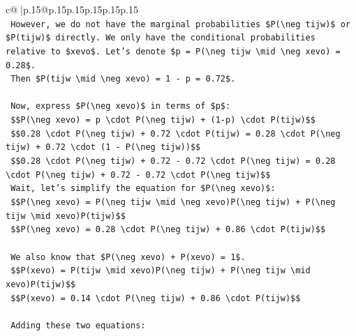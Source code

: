 \documentclass{article}
\begin{document}
{\begin{supertabular}{c@{$\;$}|p{.15\linewidth}@{}p{.15\linewidth}p{.15\linewidth}p{.15\linewidth}p{.15\linewidth}p{.15\linewidth}}
{{{\\ 
\texttt{    However, we do not have the marginal probabilities \$P(\textbackslash{}neg tijw)\$ or \$P(tijw)\$ directly. We only have the conditional probabilities relative to \$xevo\$. Let's denote \$p = P(\textbackslash{}neg tijw \textbackslash{}mid \textbackslash{}neg xevo) = 0.28\$.} \\
\texttt{    Then \$P(tijw \textbackslash{}mid \textbackslash{}neg xevo) = 1 {-} p = 0.72\$.} \\
\\ 
\texttt{    Now, express \$P(\textbackslash{}neg xevo)\$ in terms of \$p\$:} \\
\texttt{    \$\$P(\textbackslash{}neg xevo) = p \textbackslash{}cdot P(\textbackslash{}neg tijw) + (1{-}p) \textbackslash{}cdot P(tijw)\$\$} \\
\texttt{    \$\$0.28 \textbackslash{}cdot P(\textbackslash{}neg tijw) + 0.72 \textbackslash{}cdot P(tijw) = 0.28 \textbackslash{}cdot P(\textbackslash{}neg tijw) + 0.72 \textbackslash{}cdot (1 {-} P(\textbackslash{}neg tijw))\$\$} \\
\texttt{    \$\$0.28 \textbackslash{}cdot P(\textbackslash{}neg tijw) + 0.72 {-} 0.72 \textbackslash{}cdot P(\textbackslash{}neg tijw) = 0.28 \textbackslash{}cdot P(\textbackslash{}neg tijw) + 0.72 {-} 0.72 \textbackslash{}cdot P(\textbackslash{}neg tijw)\$\$} \\
\texttt{    Wait, let's simplify the equation for \$P(\textbackslash{}neg xevo)\$:} \\
\texttt{    \$\$P(\textbackslash{}neg xevo) = P(\textbackslash{}neg tijw \textbackslash{}mid \textbackslash{}neg xevo)P(\textbackslash{}neg tijw) + P(\textbackslash{}neg tijw \textbackslash{}mid xevo)P(tijw)\$\$} \\
\texttt{    \$\$P(\textbackslash{}neg xevo) = 0.28 \textbackslash{}cdot P(\textbackslash{}neg tijw) + 0.86 \textbackslash{}cdot P(tijw)\$\$} \\
\\ 
\texttt{    We also know that \$P(\textbackslash{}neg xevo) + P(xevo) = 1\$.} \\
\texttt{    \$\$P(xevo) = P(tijw \textbackslash{}mid xevo)P(\textbackslash{}neg tijw) + P(\textbackslash{}neg tijw \textbackslash{}mid xevo)P(tijw)\$\$} \\
\texttt{    \$\$P(xevo) = 0.14 \textbackslash{}cdot P(\textbackslash{}neg tijw) + 0.86 \textbackslash{}cdot P(tijw)\$\$} \\
\\ 
\texttt{    Adding these two equations:} \\
}}}
\end{supertabular}}
\end{document}
